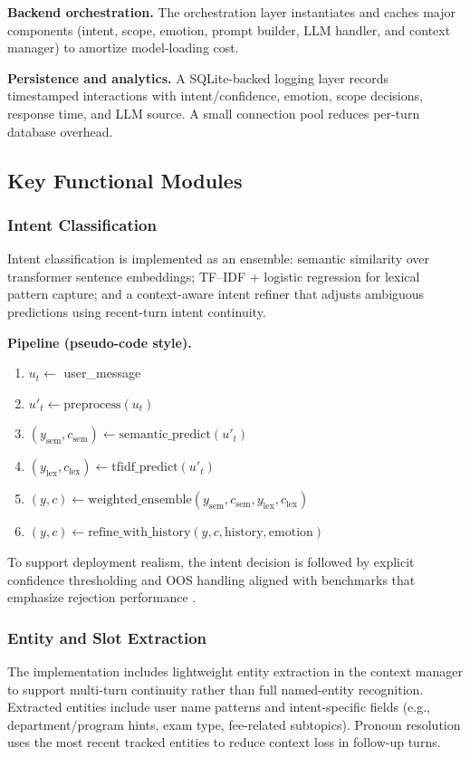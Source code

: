 \documentclass[12pt,onecolumn]{report}
\begin{document}
\textbf{Backend orchestration.} The orchestration layer instantiates and caches major components (intent, scope, emotion, prompt builder, LLM handler, and context manager) to amortize model-loading cost.

\textbf{Persistence and analytics.} A SQLite-backed logging layer records timestamped interactions with intent/confidence, emotion, scope decisions, response time, and LLM source. A small connection pool reduces per-turn database overhead.

\subsection{Key Functional Modules}
\subsubsection{Intent Classification}
Intent classification is implemented as an ensemble: semantic similarity over transformer sentence embeddings; TF--IDF + logistic regression for lexical pattern capture; and a context-aware intent refiner that adjusts ambiguous predictions using recent-turn intent continuity.

\textbf{Pipeline (pseudo-code style).}
\begin{enumerate}
	\item $u_t \leftarrow$ user\_message
	\item $u'_t \leftarrow \mathrm{preprocess}(u_t)$
	\item $(y_{\mathrm{sem}},c_{\mathrm{sem}}) \leftarrow \mathrm{semantic\_predict}(u'_t)$
	\item $(y_{\mathrm{lex}},c_{\mathrm{lex}}) \leftarrow \mathrm{tfidf\_predict}(u'_t)$
	\item $(y,c) \leftarrow \mathrm{weighted\_ensemble}(y_{\mathrm{sem}},c_{\mathrm{sem}},y_{\mathrm{lex}},c_{\mathrm{lex}})$
	\item $(y,c) \leftarrow \mathrm{refine\_with\_history}(y,c,\mathrm{history},\mathrm{emotion})$
\end{enumerate}
To support deployment realism, the intent decision is followed by explicit confidence thresholding and OOS handling aligned with benchmarks that emphasize rejection performance \cite{larson2019clinc150}.

\subsubsection{Entity and Slot Extraction}
The implementation includes lightweight entity extraction in the context manager to support multi-turn continuity rather than full named-entity recognition. Extracted entities include user name patterns and intent-specific fields (e.g., department/program hints, exam type, fee-related subtopics). Pronoun resolution uses the most recent tracked entities to reduce context loss in follow-up turns.
\end{document}
